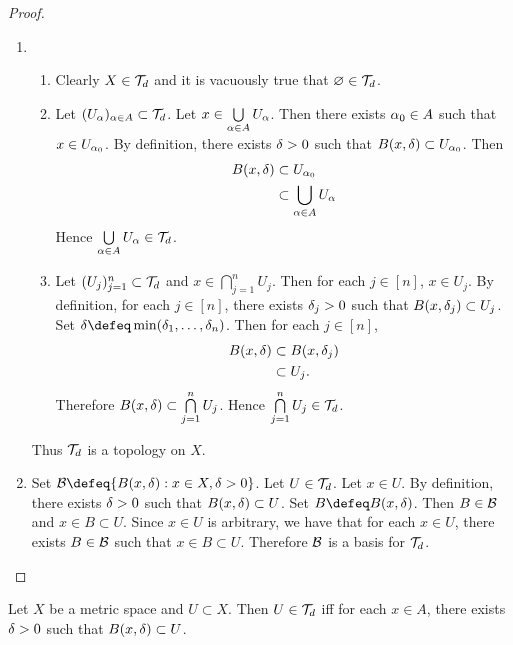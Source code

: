 \documentclass{book}
\begin{document}
\begin{proof}\
	\begin{enumerate}
		\item 
		\begin{enumerate}
			\item Clearly $X \in \mathcal{T}_d$ and it is vacuously true that $\varnothing \in \mathcal{T}_d$.
			\item Let $(U_{\alpha})_{\alpha \in A} \subset \mathcal{T}_d$. Let $x \in \bigcup\limits_{\alpha \in A} U_{\alpha}$. Then there exists $\alpha_0 \in A$ such that $x \in U_{\alpha_0}$. By definition, there exists $\delta > 0$ such that $B(x, \delta) \subset U_{\alpha_0}$. Then 
			\begin{align*}
				B(x, \delta) 
				& \subset U_{\alpha_0} \\
				& \subset \bigcup_{\alpha \in A} U_{\alpha} 
			\end{align*}
			Hence $\bigcup\limits_{\alpha \in A} U_{\alpha} \in \mathcal{T}_d$.
			\item Let $(U_j)_{j=1}^n \subset \mathcal{T}_d$ and $x \in \bigcap\limits_{j =1}^n U_j$. Then for each $j \in [n]$, $x \in U_j$. By definition, for each $j \in [n]$, there exists $\delta_j > 0$ such that $B(x, \delta_j) \subset U_j$. Set $\del \defeq \min(\del_1, \ldots, \del_n)$. Then for each $j \in [n]$, 
			\begin{align*}
				B(x, \delta)
				& \subset B(x, \delta_j) \\
				& \subset U_j.
			\end{align*}
			Therefore $B(x, \delta) \subset \bigcap\limits_{j=1}^n U_j$. Hence $\bigcap\limits_{j=1}^n U_j \in \mathcal{T}_d$.
		\end{enumerate}
		Thus $\mathcal{T}_d$ is a topology on $X$.
		\item Set $\MB \defeq \{B(x, \del): x \in X, \del >0\}$. Let $U \in \mathcal{T}_d$. Let $x \in U$. By definition, there exists $\delta >0$ such that $B(x, \delta) \subset U$. Set $B \defeq B(x, \del)$. Then $B \in \mathcal{B}$ and $x \in B \subset U$. Since $x \in U$ is arbitrary, we have that for each $x \in U$, there exists $B \in \mathcal{B}$ such that $x \in B \subset U$. Therefore $\mathcal{B}$ is a basis for $\mathcal{T}_d$.
	\end{enumerate}
\end{proof}

\begin{ex} 
	Let $X$ be a metric space and $U \subset X$. Then $U \in \mathcal{T}_d$ iff for each $x \in A$, there exists $\delta > 0$ such that $B(x, \delta) \subset U$.
\end{ex}
\end{document}
